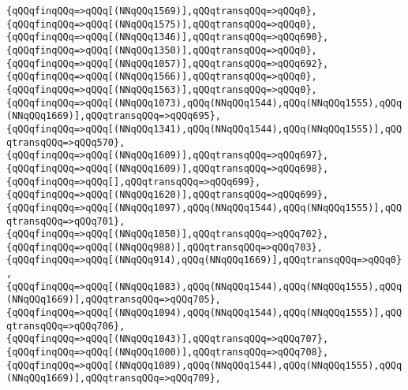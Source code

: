 \verb|{qQQqfinqQQq=>qQQq[(NNqQQq1569)],qQQqtransqQQq=>qQQq0},|\newline
\verb|{qQQqfinqQQq=>qQQq[(NNqQQq1575)],qQQqtransqQQq=>qQQq0},|\newline
\verb|{qQQqfinqQQq=>qQQq[(NNqQQq1346)],qQQqtransqQQq=>qQQq690},|\newline
\verb|{qQQqfinqQQq=>qQQq[(NNqQQq1350)],qQQqtransqQQq=>qQQq0},|\newline
\verb|{qQQqfinqQQq=>qQQq[(NNqQQq1057)],qQQqtransqQQq=>qQQq692},|\newline
\verb|{qQQqfinqQQq=>qQQq[(NNqQQq1566)],qQQqtransqQQq=>qQQq0},|\newline
\verb|{qQQqfinqQQq=>qQQq[(NNqQQq1563)],qQQqtransqQQq=>qQQq0},|\newline
\verb|{qQQqfinqQQq=>qQQq[(NNqQQq1073),qQQq(NNqQQq1544),qQQq(NNqQQq1555),qQQq(NNqQQq1669)],qQQqtransqQQq=>qQQq695},|\newline
\verb|{qQQqfinqQQq=>qQQq[(NNqQQq1341),qQQq(NNqQQq1544),qQQq(NNqQQq1555)],qQQqtransqQQq=>qQQq570},|\newline
\verb|{qQQqfinqQQq=>qQQq[(NNqQQq1609)],qQQqtransqQQq=>qQQq697},|\newline
\verb|{qQQqfinqQQq=>qQQq[(NNqQQq1609)],qQQqtransqQQq=>qQQq698},|\newline
\verb|{qQQqfinqQQq=>qQQq[],qQQqtransqQQq=>qQQq699},|\newline
\verb|{qQQqfinqQQq=>qQQq[(NNqQQq1620)],qQQqtransqQQq=>qQQq699},|\newline
\verb|{qQQqfinqQQq=>qQQq[(NNqQQq1097),qQQq(NNqQQq1544),qQQq(NNqQQq1555)],qQQqtransqQQq=>qQQq701},|\newline
\verb|{qQQqfinqQQq=>qQQq[(NNqQQq1050)],qQQqtransqQQq=>qQQq702},|\newline
\verb|{qQQqfinqQQq=>qQQq[(NNqQQq988)],qQQqtransqQQq=>qQQq703},|\newline
\verb|{qQQqfinqQQq=>qQQq[(NNqQQq914),qQQq(NNqQQq1669)],qQQqtransqQQq=>qQQq0},|\newline
\verb|{qQQqfinqQQq=>qQQq[(NNqQQq1083),qQQq(NNqQQq1544),qQQq(NNqQQq1555),qQQq(NNqQQq1669)],qQQqtransqQQq=>qQQq705},|\newline
\verb|{qQQqfinqQQq=>qQQq[(NNqQQq1094),qQQq(NNqQQq1544),qQQq(NNqQQq1555)],qQQqtransqQQq=>qQQq706},|\newline
\verb|{qQQqfinqQQq=>qQQq[(NNqQQq1043)],qQQqtransqQQq=>qQQq707},|\newline
\verb|{qQQqfinqQQq=>qQQq[(NNqQQq1000)],qQQqtransqQQq=>qQQq708},|\newline
\verb|{qQQqfinqQQq=>qQQq[(NNqQQq1089),qQQq(NNqQQq1544),qQQq(NNqQQq1555),qQQq(NNqQQq1669)],qQQqtransqQQq=>qQQq709},|\newline
